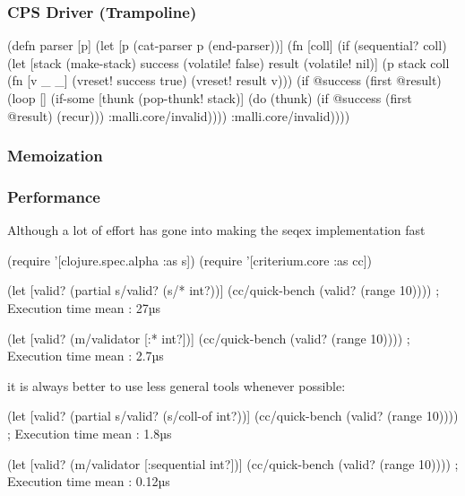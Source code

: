\documentclass{beamer}
\begin{document}

\begin{frame}[fragile]
\frametitle{CPS Driver (Trampoline)}

{\scriptsize
\begin{semiverbatim}
(defn parser [p]
  (let [p (cat-parser p (end-parser))]
    (fn [coll]
      (if (sequential? coll)
        (let [stack (make-stack)
              success (volatile! false)
              result (volatile! nil)]
          (p stack coll (fn [v _ _]
                          (vreset! success true)
                          (vreset! result v)))
          (if @success
            (first @result)
            (loop []
              (if-some [thunk (pop-thunk! stack)]
                (do
                  (thunk)
                  (if @success
                    (first @result)
                    (recur)))
                :malli.core/invalid))))
        :malli.core/invalid))))
\end{semiverbatim}
}

\end{frame}


\begin{frame}
\frametitle{Memoization}
\end{frame}


\begin{frame}[fragile]
\frametitle{Performance}

\begin{displayquote}
Although a lot of effort has gone into making the seqex implementation fast
\end{displayquote}

{\tiny
\begin{semiverbatim}
(require '[clojure.spec.alpha :as s])
(require '[criterium.core :as cc])

(let [valid? (partial s/valid? (s/* int?))]
  (cc/quick-bench (valid? (range 10)))) ; Execution time mean : 27µs

(let [valid? (m/validator [:* int?])]
  (cc/quick-bench (valid? (range 10)))) ; Execution time mean : 2.7µs
\end{semiverbatim}
}

\begin{displayquote}
it is always better to use less general tools whenever possible:
\end{displayquote}

{\tiny
\begin{semiverbatim}
(let [valid? (partial s/valid? (s/coll-of int?))]
  (cc/quick-bench (valid? (range 10)))) ; Execution time mean : 1.8µs

(let [valid? (m/validator [:sequential int?])]
  (cc/quick-bench (valid? (range 10)))) ; Execution time mean : 0.12µs
\end{semiverbatim}
}
\end{frame}
\end{document}
